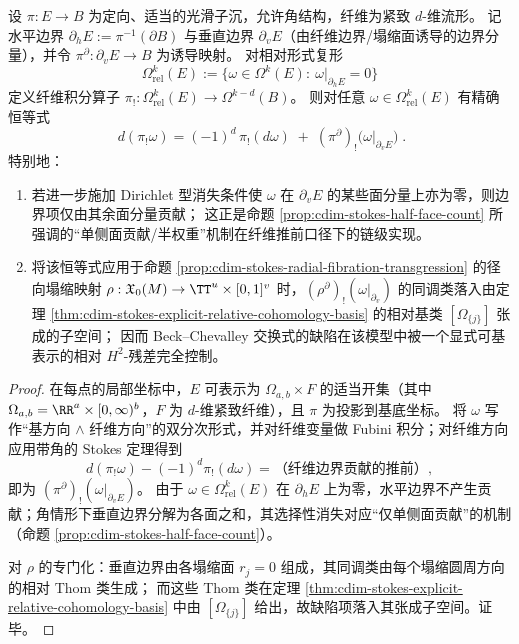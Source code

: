 \begin{proposition}\label{prop:cdim-stokes-fiber-integration-defect}
设 \(\pi:E\to B\) 为定向、适当的光滑子沉，允许角结构，纤维为紧致 \(d\)-维流形。
记水平边界 \(\partial_hE:=\pi^{-1}(\partial B)\) 与垂直边界 \(\partial_vE\)（由纤维边界/塌缩面诱导的边界分量），并令 \(\pi^{\partial}:\partial_vE\to B\) 为诱导映射。
对相对形式复形
\[
\Omega_{\mathrm{rel}}^{k}(E):=\{\omega\in\Omega^{k}(E):\ \omega|_{\partial_hE}=0\}
\]
定义纤维积分算子 \(\pi_!:\Omega_{\mathrm{rel}}^{k}(E)\to \Omega^{k-d}(B)\)。
则对任意 \(\omega\in\Omega_{\mathrm{rel}}^{k}(E)\) 有精确恒等式
\[
\boxed{\;
d(\pi_!\omega)=(-1)^d\,\pi_!(d\omega)\;+\;(\pi^{\partial})_!\bigl(\omega|_{\partial_vE}\bigr)\; } .
\]
特别地：
\begin{enumerate}
  \item 若进一步施加 Dirichlet 型消失条件使 \(\omega\) 在 \(\partial_vE\) 的某些面分量上亦为零，则边界项仅由其余面分量贡献；
  这正是命题 \ref{prop:cdim-stokes-half-face-count} 所强调的“单侧面贡献/半权重”机制在纤维推前口径下的链级实现。
  \item 将该恒等式应用于命题 \ref{prop:cdim-stokes-radial-fibration-transgression} 的径向塌缩映射
  \(
  \rho:\mathfrak X_0(M)\to \TT^u\times[0,1]^v
  \)
  时，\((\rho^{\partial})_!(\omega|_{\partial_v})\) 的同调类落入由定理 \ref{thm:cdim-stokes-explicit-relative-cohomology-basis} 的相对基类 \([\Omega_{\{j\}}]\) 张成的子空间；
  因而 Beck--Chevalley 交换式的缺陷在该模型中被一个显式可基表示的相对 \(H^2\)-残差完全控制。
\end{enumerate}
\end{proposition}
\begin{proof}
在每点的局部坐标中，\(E\) 可表示为 \(\Omega_{a,b}\times F\) 的适当开集（其中 \(\Omega_{a,b}=\RR^{a}\times[0,\infty)^{b}\)，\(F\) 为 \(d\)-维紧致纤维），且 \(\pi\) 为投影到基底坐标。
将 \(\omega\) 写作“基方向 \(\wedge\) 纤维方向”的双分次形式，并对纤维变量做 Fubini 积分；对纤维方向应用带角的 Stokes 定理得到
\[
d(\pi_!\omega)-(-1)^d\pi_!(d\omega)=\text{（纤维边界贡献的推前）},
\]
即为 \((\pi^{\partial})_!(\omega|_{\partial_vE})\)。
由于 \(\omega\in\Omega_{\mathrm{rel}}^{k}(E)\) 在 \(\partial_hE\) 上为零，水平边界不产生贡献；角情形下垂直边界分解为各面之和，其选择性消失对应“仅单侧面贡献”的机制（命题 \ref{prop:cdim-stokes-half-face-count}）。
\par
对 \(\rho\) 的专门化：垂直边界由各塌缩面 \(r_j=0\) 组成，其同调类由每个塌缩圆周方向的相对 Thom 类生成；
而这些 Thom 类在定理 \ref{thm:cdim-stokes-explicit-relative-cohomology-basis} 中由 \([\Omega_{\{j\}}]\) 给出，故缺陷项落入其张成子空间。证毕。
\end{proof}

\endinput
